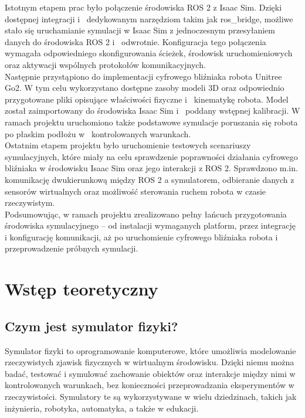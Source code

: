 \documentclass[12pt]{article}
\begin{document}
\noindent Istotnym etapem prac było połączenie środowiska ROS 2 z Isaac Sim. Dzięki dostępnej integracji i~ dedykowanym narzędziom takim jak ros\_bridge, możliwe stało się uruchamianie symulacji w Isaac Sim z jednoczesnym przesyłaniem danych do środowiska ROS 2 i~ odwrotnie. Konfiguracja tego połączenia wymagała odpowiedniego skonfigurowania ścieżek, środowisk uruchomieniowych oraz aktywacji wspólnych protokołów komunikacyjnych.\\

\noindent Następnie przystąpiono do implementacji cyfrowego bliźniaka robota Unitree Go2. W tym celu wykorzystano dostępne zasoby modeli 3D oraz odpowiednio przygotowane pliki opisujące właściwości fizyczne i~ kinematykę robota. Model został zaimportowany do środowiska Isaac Sim i~ poddany wstępnej kalibracji. W ramach projektu uruchomiono także podstawowe symulacje poruszania się robota po płaskim podłożu w~ kontrolowanych warunkach.\\

\noindent Ostatnim etapem projektu było uruchomienie testowych scenariuszy symulacyjnych, które miały na celu sprawdzenie poprawności działania cyfrowego bliźniaka w środowisku Isaac Sim oraz jego interakcji z ROS 2. Sprawdzono m.in. komunikację dwukierunkową między ROS 2 a symulatorem, odbieranie danych z sensorów wirtualnych oraz możliwość sterowania ruchem robota w czasie rzeczywistym.\\

\noindent Podsumowując, w ramach projektu zrealizowano pełny łańcuch przygotowania środowiska symulacyjnego – od instalacji wymaganych platform, przez integrację i konfigurację komunikacji, aż po uruchomienie cyfrowego bliźniaka robota i przeprowadzenie próbnych symulacji.

\section{Wstęp teoretyczny}

\subsection{Czym jest symulator fizyki?}
Symulator fizyki to oprogramowanie komputerowe, które umożliwia modelowanie rzeczywistych zjawisk fizycznych w wirtualnym środowisku. Dzięki niemu można badać, testować i symulować zachowanie obiektów oraz interakcje między nimi w kontrolowanych warunkach, bez konieczności przeprowadzania eksperymentów w rzeczywistości. Symulatory te są wykorzystywane w wielu dziedzinach, takich jak inżynieria, robotyka, automatyka, a także w edukacji.
\end{document}
